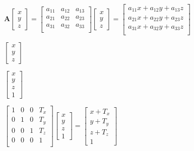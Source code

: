 \documentclass[12pt]{article}
\begin{document}
$
\boldsymbol{A}
\begin{bmatrix} 
x \\
y \\
z 
\end{bmatrix}
=
\begin{bmatrix} 
a_{11} & a_{12} & a_{13} \\ 
a_{21} & a_{22} & a_{23} \\ 
a_{31} & a_{32} & a_{33} \\ 
\end{bmatrix}
\begin{bmatrix} 
x \\
y \\
z 
\end{bmatrix}
=
\begin{bmatrix} 
a_{11}x + a_{12}y + a_{13}z \\ 
a_{21}x + a_{22}y + a_{23}z \\ 
a_{31}x + a_{32}y + a_{33}z \\ 
\end{bmatrix}
$

\vspace{4ex}

$
\begin{bmatrix} 
x \\ 
y \\
z
\end{bmatrix}
$

\vspace{4ex}

$
\begin{bmatrix} 
x \\ 
y \\
z \\
1
\end{bmatrix}
$


\vspace{4ex}

$
\begin{bmatrix} 
1 & 0 & 0 & T_x \\ 
0 & 1 & 0 & T_y \\ 
0 & 0 & 1 & T_z \\ 
0 & 0 & 0 & 1 \\ 
\end{bmatrix}
\begin{bmatrix} 
x \\
y \\
z \\
1
\end{bmatrix}
=
\begin{bmatrix} 
x + T_x \\ 
y + T_y \\
z + T_z \\
1
\end{bmatrix}
$
\end{document}
